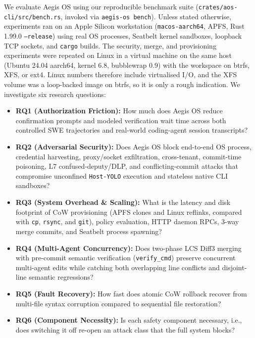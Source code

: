 \documentclass[acmsmall,screen,review]{acmart}
\begin{document}
We evaluate Aegis OS using our reproducible benchmark suite (\texttt{crates/aos-cli/src/bench.rs}, invoked via \texttt{aegis-os bench}). Unless stated otherwise, experiments ran on an Apple Silicon workstation (\texttt{macos-aarch64}, APFS, Rust 1.99.0 \texttt{--release}) using real OS processes, Seatbelt kernel sandboxes, loopback TCP sockets, and \texttt{cargo} builds. The security, merge, and provisioning experiments were repeated on Linux in a virtual machine on the same host (Ubuntu 24.04 aarch64, kernel 6.8, bubblewrap 0.9) with the workspace on btrfs, XFS, or ext4. Linux numbers therefore include virtualised I/O, and the XFS volume was a loop-backed image on btrfs, so it is only a rough indication. We investigate six research questions:
\begin{itemize}
    \item \textbf{RQ1 (Authorization Friction):} How much does Aegis OS reduce confirmation prompts and modeled verification wait time across both controlled SWE trajectories and real-world coding-agent session transcripts?
    \item \textbf{RQ2 (Adversarial Security):} Does Aegis OS block end-to-end OS process, credential harvesting, proxy/socket exfiltration, cross-tenant, commit-time poisoning, L7 confused-deputy/DLP, and conflicting-commit attacks that compromise unconfined \texttt{Host-YOLO} execution and stateless native CLI sandboxes?
    \item \textbf{RQ3 (System Overhead \& Scaling):} What is the latency and disk footprint of CoW provisioning (APFS clones and Linux reflinks, compared with \texttt{cp}, \texttt{rsync}, and \texttt{git}), policy evaluation, HTTP daemon RPCs, 3-way merge commits, and Seatbelt process spawning?
    \item \textbf{RQ4 (Multi-Agent Concurrency):} Does two-phase LCS Diff3 merging with pre-commit semantic verification (\texttt{verify\_cmd}) preserve concurrent multi-agent edits while catching both overlapping line conflicts and disjoint-line semantic regressions?
    \item \textbf{RQ5 (Fault Recovery):} How fast does atomic CoW rollback recover from multi-file syntax corruption compared to sequential file restoration?
    \item \textbf{RQ6 (Component Necessity):} Is each safety component necessary, i.e., does switching it off re-open an attack class that the full system blocks?
\end{itemize}
\end{document}
